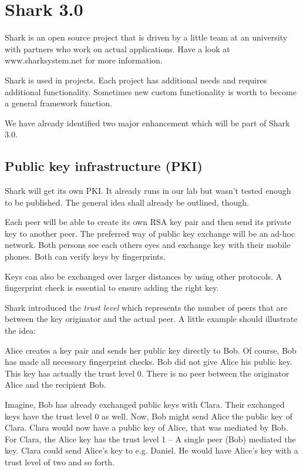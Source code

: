 \chapter{Shark 3.0}
Shark is an open source project that is driven by a little team at an university with partners who work on actual applications. Have a look at www.sharksystem.net for more information.

Shark is used in projects. Each project has additional needs and requires additional functionality. Sometimes new custom functionality is worth to become a general framework function.

We have already identified two major enhancement which will be part of Shark 3.0.


\section{Public key infrastructure (PKI)}
Shark will get its own PKI. It already runs in our lab but wasn't tested enough to be published. The general idea shall already be outlined, though.

Each peer will be able to create its own RSA key pair and then send its private key to another peer. The preferred way of public key exchange will be an ad-hoc network. Both persons see each others eyes and exchange key with their mobile phones.
Both can verify keys by fingerprints.

Keys can also be exchanged over larger distances by using other protocols. A fingerprint check is essential to ensure adding the right key.

Shark introduced the {\it trust level} which represents the number of peers that are between the key originator and the actual peer. A little example should illustrate the idea:

Alice creates a key pair and sends her public key directly to Bob. Of course, Bob has made all necessary fingerprint checks. Bob did not give Alice his public key. This key has actually the trust level 0. There is no peer between the originator Alice and the recipient Bob.

Imagine, Bob has already exchanged public keys with Clara. Their exchanged keys have the trust level 0 as well. Now, Bob might send Alice the public key of Clara. Clara would now have a public key of Alice, that was mediated by Bob. For Clara, the Alice key has the trust level 1 -- A single peer (Bob) mediated the key. Clara could send Alice's key to e.g. Daniel. He would have Alice's key with a trust level of two and so forth.

